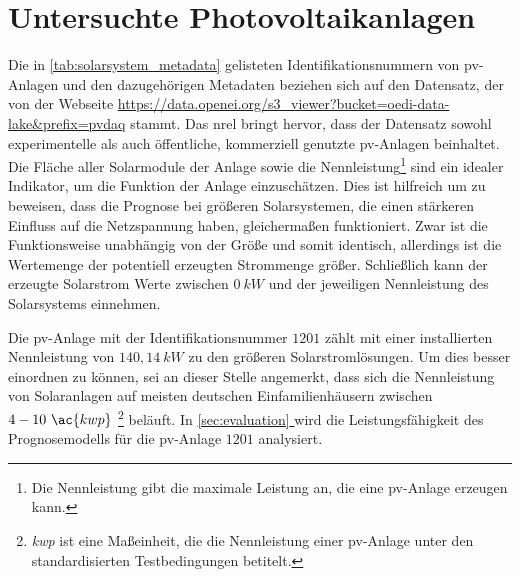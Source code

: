 \documentclass[12pt, a4paper]{article}
\newcommand*{\fullref}[1]{\hyperref[{#1}]{\autoref*{#1} \textit{\nameref*{#1}}}}
\begin{document}
\newpage

\section{Untersuchte Photovoltaikanlagen}

Die in \autoref{tab:solarsystem_metadata} gelisteten Identifikationsnummern von \ac{pv}-Anlagen und den dazugehörigen Metadaten beziehen sich auf den Datensatz, der von der Webseite \url{https://data.openei.org/s3_viewer?bucket=oedi-data-lake&prefix=pvdaq} \newline stammt. Das \ac{nrel} bringt hervor, dass der Datensatz sowohl experimentelle als auch öffentliche, kommerziell genutzte \ac{pv}-Anlagen beinhaltet. Die Fläche aller Solarmodule der Anlage sowie die Nennleistung\footnote{Die Nennleistung gibt die maximale Leistung an, die eine \ac{pv}-Anlage erzeugen kann.} sind ein idealer Indikator, um die Funktion der Anlage einzuschätzen. Dies ist hilfreich um zu beweisen, dass die Prognose bei größeren Solarsystemen, die einen stärkeren Einfluss auf die Netzspannung haben, gleichermaßen funktioniert. Zwar ist die Funktionsweise unabhängig von der Größe und somit identisch, allerdings ist die Wertemenge der potentiell erzeugten Strommenge größer. Schließlich kann der erzeugte Solarstrom Werte zwischen $0 \ kW$ und der jeweiligen Nennleistung des Solarsystems einnehmen. 

Die \ac{pv}-Anlage mit der Identifikationsnummer $1201$ zählt mit einer installierten Nennleistung von $140,14 \ kW$ zu den größeren Solarstromlösungen. Um dies besser einordnen zu können, sei an dieser Stelle angemerkt, dass sich die Nennleistung von Solaranlagen auf meisten deutschen Einfamilienhäusern zwischen $4 - 10 \ \ac{kwp}$ \footnote{\textit{\ac{kwp}} ist eine Maßeinheit, die die Nennleistung einer \ac{pv}-Anlage unter den standardisierten Testbedingungen betitelt.} beläuft. In \fullref{sec:evaluation} wird die Leistungsfähigkeit des Prognosemodells für die \ac{pv}-Anlage $1201$ analysiert.
\end{document}
